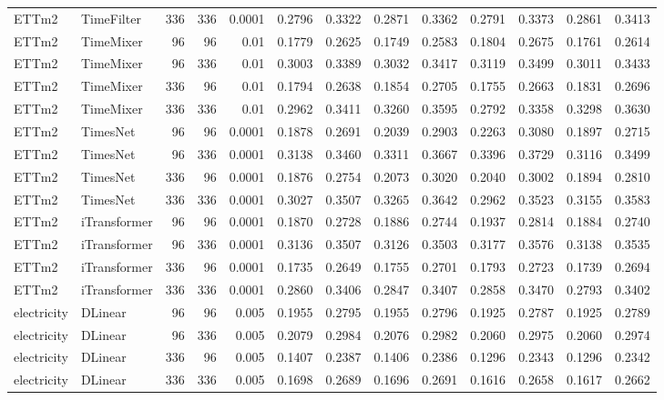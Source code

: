 \begin{longtable}{@{}llrrr*{8}{r}@{}}
ETTm2 & TimeFilter & 336 & 336 & 0.0001 & 0.2796 & 0.3322 & 0.2871 & 0.3362 & 0.2791 & 0.3373 & 0.2861 & 0.3413 \\
ETTm2 & TimeMixer & 96 & 96 & 0.01 & 0.1779 & 0.2625 & 0.1749 & 0.2583 & 0.1804 & 0.2675 & 0.1761 & 0.2614 \\
ETTm2 & TimeMixer & 96 & 336 & 0.01 & 0.3003 & 0.3389 & 0.3032 & 0.3417 & 0.3119 & 0.3499 & 0.3011 & 0.3433 \\
ETTm2 & TimeMixer & 336 & 96 & 0.01 & 0.1794 & 0.2638 & 0.1854 & 0.2705 & 0.1755 & 0.2663 & 0.1831 & 0.2696 \\
ETTm2 & TimeMixer & 336 & 336 & 0.01 & 0.2962 & 0.3411 & 0.3260 & 0.3595 & 0.2792 & 0.3358 & 0.3298 & 0.3630 \\
ETTm2 & TimesNet & 96 & 96 & 0.0001 & 0.1878 & 0.2691 & 0.2039 & 0.2903 & 0.2263 & 0.3080 & 0.1897 & 0.2715 \\
ETTm2 & TimesNet & 96 & 336 & 0.0001 & 0.3138 & 0.3460 & 0.3311 & 0.3667 & 0.3396 & 0.3729 & 0.3116 & 0.3499 \\
ETTm2 & TimesNet & 336 & 96 & 0.0001 & 0.1876 & 0.2754 & 0.2073 & 0.3020 & 0.2040 & 0.3002 & 0.1894 & 0.2810 \\
ETTm2 & TimesNet & 336 & 336 & 0.0001 & 0.3027 & 0.3507 & 0.3265 & 0.3642 & 0.2962 & 0.3523 & 0.3155 & 0.3583 \\
ETTm2 & iTransformer & 96 & 96 & 0.0001 & 0.1870 & 0.2728 & 0.1886 & 0.2744 & 0.1937 & 0.2814 & 0.1884 & 0.2740 \\
ETTm2 & iTransformer & 96 & 336 & 0.0001 & 0.3136 & 0.3507 & 0.3126 & 0.3503 & 0.3177 & 0.3576 & 0.3138 & 0.3535 \\
ETTm2 & iTransformer & 336 & 96 & 0.0001 & 0.1735 & 0.2649 & 0.1755 & 0.2701 & 0.1793 & 0.2723 & 0.1739 & 0.2694 \\
ETTm2 & iTransformer & 336 & 336 & 0.0001 & 0.2860 & 0.3406 & 0.2847 & 0.3407 & 0.2858 & 0.3470 & 0.2793 & 0.3402 \\
electricity & DLinear & 96 & 96 & 0.005 & 0.1955 & 0.2795 & 0.1955 & 0.2796 & 0.1925 & 0.2787 & 0.1925 & 0.2789 \\
electricity & DLinear & 96 & 336 & 0.005 & 0.2079 & 0.2984 & 0.2076 & 0.2982 & 0.2060 & 0.2975 & 0.2060 & 0.2974 \\
electricity & DLinear & 336 & 96 & 0.005 & 0.1407 & 0.2387 & 0.1406 & 0.2386 & 0.1296 & 0.2343 & 0.1296 & 0.2342 \\
electricity & DLinear & 336 & 336 & 0.005 & 0.1698 & 0.2689 & 0.1696 & 0.2691 & 0.1616 & 0.2658 & 0.1617 & 0.2662 \\

\end{longtable}
